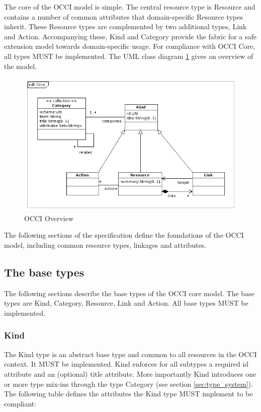 \documentclass[10pt,a4paper]{article}
\begin{document}
The core of the OCCI model is simple. The central resource type is Resource and
contains a number of common attributes that domain-specific Resource types
inherit. These Resource types are complemented by two additional types, Link
and Action. Accompanying these, Kind and Category provide the fabric for a safe
extension model towards domain-specific usage. For compliance with OCCI Core,
all types MUST be implemented. The UML class diagram \ref{fig:occi_core} gives
an overview of the model.

\clearpage
\begin{figure}[!h]
	\centering
	\includegraphics[scale=0.5]{figs/core_model.png}
	\caption{OCCI Overview}
	\label{fig:occi_core}
\end{figure}

The following sections of the specification define the foundations of the OCCI
model, including common resource types, linkages and attributes.

\subsection{The base types}
The following sections describe the base types of the OCCI core model. The base
types are Kind, Category, Resource, Link and Action. All base types MUST be
implemented.

\subsubsection{Kind}
The Kind type is an abstract base type and common to all resources in the OCCI
context. It MUST be implemented. Kind enforces for all subtypes a required id
attribute and an (optional) title attribute. More importantly Kind introduces
one or more type mix-ins through the type Category (see section
\ref{sec:type_system}). The following table defines the attributes the Kind
type MUST implement to be compliant:
\end{document}

